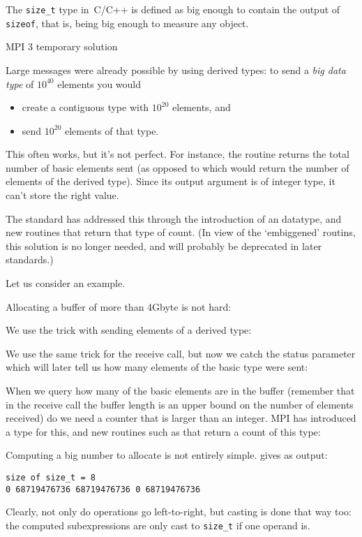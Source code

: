 The \lstinline+size_t+ type in~C/C++ is defined as big enough to
contain the output of \lstinline+sizeof+, that is,
being big enough to measure any object.

 {MPI 3 temporary solution}

Large messages were already possible by using 
derived types: to send
a \emph{big data type} of $10^{40}$ elements you would
\begin{itemize}
\item create a contiguous type with $10^{20}$ elements, and
\item send $10^{20}$ elements of that type.
\end{itemize}
This often works, but it's not perfect. For instance, the routine
 returns the total number of basic elements sent
(as opposed to  which would return the number
of elements of the derived type). Since its output argument is
of integer type, it can't store the right value.

The  standard has addressed this
through the introduction of an  datatype,
and new routines that return that type of count.
(In view of the `embiggened' routins, this solution
is no longer needed, and will probably be deprecated in later standards.)

Let us consider an example.

Allocating a buffer of more than 4Gbyte is not hard:

We use the trick with sending elements of a derived type:

We use the same trick for the receive call, but now we catch the status
parameter which will later tell us how many elements of the basic type
were sent:
%

When we query how many of the basic elements are in the buffer
(remember that in the receive call the buffer length is
an upper bound on the number of elements received)
do we
need a counter that is larger than an integer.  MPI has introduced a
type  for this, and new routines such as
 that return a
count of this type:


\begin{remark}
  Computing a big number to allocate is not entirely simple.
  gives as output:
\begin{verbatim}
size of size_t = 8
0 68719476736 68719476736 0 68719476736
\end{verbatim}
Clearly, not only do operations go left-to-right, but casting is done that way too:
the computed subexpressions are only cast to \lstinline{size_t} if one operand is.
\end{remark}

